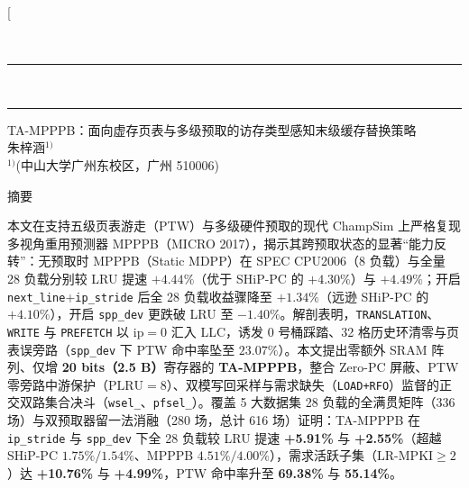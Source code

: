 \documentclass[10.5pt,compsoc,UTF8]{CjC}
\begin{document}
\twocolumn[{
\vspace*{-20mm}
\\[0.2mm]
\rule{\textwidth}{0.6pt}\\[-2.2mm]\rule{\textwidth}{0.6pt}
\vspace{1mm}
\begin{center}
{\heiti TA-MPPPB：面向虚存页表与多级预取的访存类型感知末级缓存替换策略}\\[0.15\baselineskip]
{\fangsong 朱梓涵$^{1)}$}\\[0.05\baselineskip]
{\songti $^{1)}$(中山大学广州东校区，广州 510006)}
\end{center}
\vspace{1mm}

{\noindent{}\heiti 摘\quad 要}\quad
{\songti
本文在支持五级页表游走（PTW）与多级硬件预取的现代 ChampSim 上严格复现多视角重用预测器 MPPPB（MICRO 2017），揭示其跨预取状态的显著“能力反转”：无预取时 MPPPB（Static MDPP）在 SPEC CPU2006（8 负载）与全量 28 负载分别较 LRU 提速 $+4.44\%$（优于 SHiP-PC 的 $+4.30\%$）与 $+4.49\%$；开启 \texttt{next\_line}+\texttt{ip\_stride} 后全 28 负载收益骤降至 $+1.34\%$（远逊 SHiP-PC 的 $+4.10\%$），开启 \texttt{spp\_dev} 更跌破 LRU 至 $-1.40\%$。解剖表明，\texttt{TRANSLATION}、\texttt{WRITE} 与 \texttt{PREFETCH} 以 $\mathrm{ip}=0$ 汇入 LLC，诱发 0 号桶踩踏、32 格历史环清零与页表误旁路（\texttt{spp\_dev} 下 PTW 命中率坠至 $23.07\%$）。本文提出零额外 SRAM 阵列、仅增 \textbf{20 bits（2.5 B）}寄存器的 \textbf{TA-MPPPB}，整合 Zero-PC 屏蔽、PTW 零旁路中游保护（$\mathrm{PLRU}=8$）、双模写回采样与需求缺失（\texttt{LOAD+RFO}）监督的正交双路集合决斗（\texttt{wsel\_}、\texttt{pfsel\_}）。覆盖 5 大数据集 28 负载的全满贯矩阵（336 场）与双预取器留一法消融（280 场，总计 616 场）证明：TA-MPPPB 在 \texttt{ip\_stride} 与 \texttt{spp\_dev} 下全 28 负载较 LRU 提速 \textbf{+5.91\%} 与 \textbf{+2.55\%}（超越 SHiP-PC $1.75\%/1.54\%$、MPPPB $4.51\%/4.00\%$），需求活跃子集（$\mathrm{LR\text{-}MPKI}\ge 2$）达 \textbf{+10.76\%} 与 \textbf{+4.99\%}，PTW 命中率升至 \textbf{69.38\%} 与 \textbf{55.14\%}。\par}\vspace{3pt}

}
\end{document}
